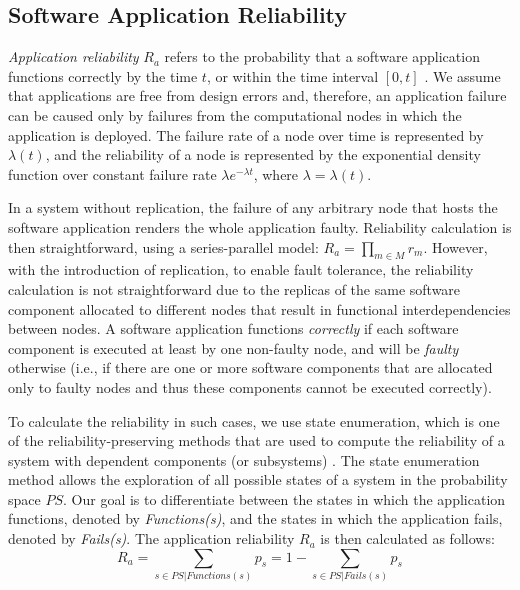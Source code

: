 \subsection{Software Application Reliability}
\textit{Application reliability} $R_a$ refers to the probability that a software application functions correctly by the time $t$, or within the time interval $[0, t]$ \cite{Goel1985SoftwareApplicability}. We assume that  applications are free from design errors and, therefore, an application failure can be caused only by failures from the computational nodes in which the application is deployed. The failure rate of a node over time is represented by $\lambda(t)$, and the reliability of a node is represented by the exponential density function over constant failure rate $\lambda e^{-\lambda t}$, where $\lambda=\lambda(t)$.

In a system without replication, the failure of any arbitrary node that hosts the software application renders the whole application faulty. Reliability calculation is then straightforward, using a series-parallel model: $R_a = \prod_{m\in M}r_m$.  However, with the introduction of replication, to enable fault tolerance, the reliability calculation is not straightforward due to the replicas of the same software component allocated to different nodes that result in functional interdependencies between nodes. A software application functions \textit{ correctly} if each software component is executed at least by one non-faulty node, and will be \textit{faulty} otherwise (i.e., if there are one or more software components that are allocated only to faulty nodes and thus these components cannot be executed correctly).

To calculate the reliability in such cases, we use state enumeration, which is one of the reliability-preserving methods that are used to compute the reliability of a system with dependent components (or subsystems) \cite{Lucet1999ExactReliability}. The state enumeration method allows the exploration of all possible states of a system in the probability space $P\!S$. Our goal is to differentiate between the states in which the application functions, denoted by \textit{Functions(s)}, and the states in which the application fails, denoted by \textit{Fails(s)}. The application reliability $R_a$ is then calculated as follows:
\begin{equation}
\label{eqn_appreliability}
R_a=\sum_{s\in PS|Functions(s)}p_s=1-\sum_{s\in PS|Fails(s)}p_s
\end{equation}

